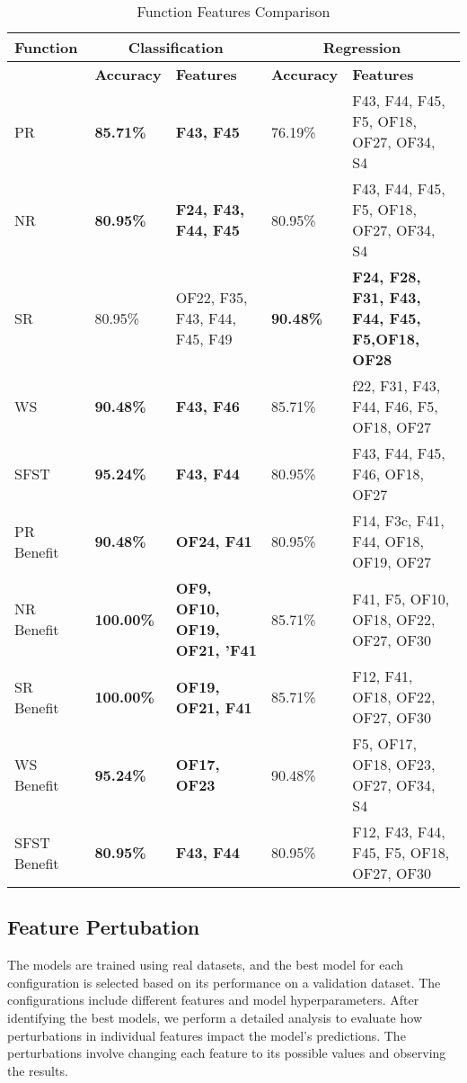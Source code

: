\documentclass[12pt,letterpaper]{article}
\begin{document}
\begin{table}[htbp]
\centering
\begin{tabular}{|p{2.5 cm}|p{2cm}|p{3.5cm}|p{2cm}|p{3.5cm}|}
\hline
\textbf{Function} & \multicolumn{2}{c|}{\textbf{Classification}} & \multicolumn{2}{c|}{\textbf{Regression}} \\
\hline
\textbf{} & \textbf{Accuracy} & \textbf{Features} & \textbf{Accuracy} & \textbf{Features} \\
\hline
PR & \textbf{85.71\%} & \textbf{F43, F45} & 76.19\% & F43, F44, F45, F5, OF18, OF27, OF34, S4 \\ \hline
NR & \textbf{80.95\%} & \textbf{F24, F43, F44, F45} & 80.95\% & F43, F44, F45, F5, OF18, OF27, OF34, S4 \\ \hline
SR & 80.95\% & OF22, F35, F43, F44, F45, F49  & \textbf{90.48\%} & \textbf{F24, F28, F31, F43, F44, F45, F5,OF18, OF28}  \\ \hline
WS & \textbf{90.48\% }&\textbf{ F43, F46} & 85.71\% & f22, F31, F43, F44, F46, F5, OF18, OF27 \\ \hline
SFST & \textbf{95.24\%} & \textbf{F43, F44} &  80.95\% & F43, F44, F45, F46, OF18, OF27 \\ \hline
PR Benefit & \textbf{90.48\% }& \textbf{OF24, F41} & 80.95\% & F14, F3c, F41, F44, OF18, OF19, OF27 \\ \hline
NR Benefit & \textbf{100.00\% }& \textbf{OF9, OF10, OF19, OF21, 'F41} &  85.71\% & F41, F5, OF10, OF18, OF22, OF27, OF30\\ \hline
SR Benefit & \textbf{100.00\%} & \textbf{OF19, OF21, F41} & 85.71\% & F12, F41, OF18, OF22, OF27, OF30 \\ \hline
WS Benefit & \textbf{95.24\%} & \textbf{OF17, OF23} & 90.48\% & F5, OF17, OF18, OF23, OF27, OF34, S4 \\ \hline
SFST Benefit &\textbf{ 80.95\%} & \textbf{F43, F44} & 80.95\% & F12, F43, F44, F45, F5, OF18, OF27, OF30 \\ \hline

\end{tabular}
\caption{Function Features Comparison}
\label{tab:function_features_comparison}
\end{table}
\clearpage

\subsection{Feature Pertubation}
The models are trained using real datasets, and the best model for each configuration is selected based on its performance on a validation dataset. The configurations include different features and model hyperparameters. After identifying the best models, we perform a detailed analysis to evaluate how perturbations in individual features impact the model's predictions. The perturbations involve changing each feature to its possible values and observing the results.
\end{document}
